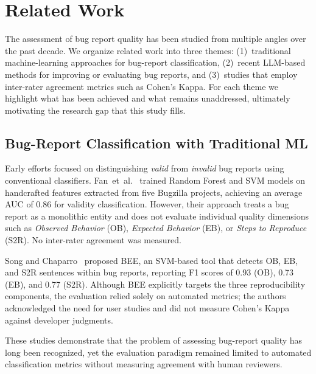 
\section{Related Work}\label{sec:related}

The assessment of bug report quality has been studied from multiple
angles over the past decade.  We organize related work into three
themes: (1)~traditional machine-learning approaches for bug-report
classification, (2)~recent LLM-based methods for improving or
evaluating bug reports, and (3)~studies that employ inter-rater
agreement metrics such as Cohen's Kappa.  For each theme we highlight
what has been achieved and what remains unaddressed, ultimately
motivating the research gap that this study fills.

\subsection{Bug-Report Classification with Traditional ML}
\label{sec:related:ml}

Early efforts focused on distinguishing \emph{valid} from
\emph{invalid} bug reports using conventional classifiers.
Fan~et~al.~\cite{fan2020chaff} trained Random Forest and SVM models
on handcrafted features extracted from five Bugzilla projects,
achieving an average AUC of 0.86 for validity classification.
However, their approach treats a bug report as a monolithic entity
and does not evaluate individual quality dimensions such as
\emph{Observed Behavior} (OB), \emph{Expected Behavior} (EB), or
\emph{Steps to Reproduce} (S2R).  No inter-rater agreement was
measured.

Song and Chaparro~\cite{song2020bee} proposed \textsc{BEE}, an SVM-based
tool that detects OB, EB, and S2R sentences within bug reports,
reporting F1 scores of 0.93 (OB), 0.73 (EB), and 0.77 (S2R).
Although BEE explicitly targets the three reproducibility
components, the evaluation relied solely on automated metrics;
the authors acknowledged the need for user studies and did not
measure Cohen's Kappa against developer judgments.

These studies demonstrate that the problem of assessing bug-report
quality has long been recognized, yet the evaluation paradigm
remained limited to automated classification metrics without
measuring agreement with human reviewers.

